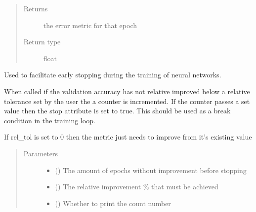 \documentclass[letterpaper,10pt,english]{sphinxmanual}
\begin{document}
\begin{fulllineitems}
\begin{fulllineitems}
\begin{quote}
\begin{description}
\item[{Returns}] \leavevmode
the error metric for that epoch

\item[{Return type}] \leavevmode
float

\end{description}\end{quote}

\end{fulllineitems}


\end{fulllineitems}


\begin{fulllineitems}
\label{\detokenize{deeplearning:Foresight.deeplearning.EarlyStopping}}
Used to facilitate early stopping during the training
of neural networks.

When called if the validation accuracy has not relative improved below a
relative tolerance set by the user the a counter is incremented. If the
counter passes a set value then the stop attribute is set to true. This
should be used as a break condition in the training loop.

If rel\_tol is set to 0 then the metric just needs to improve from it’s
existing value
\begin{quote}\begin{description}
\item[{Parameters}] \leavevmode\begin{itemize}
\item {} 
 () \textendash{} The amount of epochs without improvement before stopping

\item {} 
 () \textendash{} The relative improvement \% that must be achieved

\item {} 
 () \textendash{} Whether to print the count number


\end{itemize}
\end{description}
\end{quote}
\end{fulllineitems}
\end{document}
